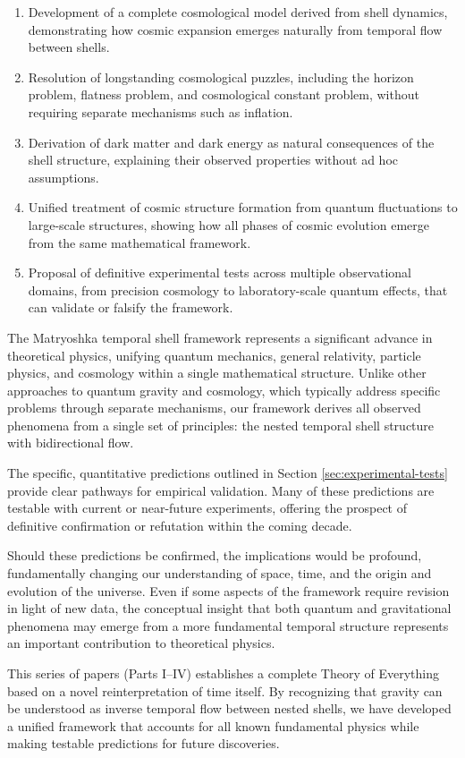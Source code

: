 \documentclass[12pt,a4paper]{article}
\begin{document}
\begin{enumerate}
    \item Development of a complete cosmological model derived from shell dynamics, demonstrating how cosmic expansion emerges naturally from temporal flow between shells.
    
    \item Resolution of longstanding cosmological puzzles, including the horizon problem, flatness problem, and cosmological constant problem, without requiring separate mechanisms such as inflation.
    
    \item Derivation of dark matter and dark energy as natural consequences of the shell structure, explaining their observed properties without ad hoc assumptions.
    
    \item Unified treatment of cosmic structure formation from quantum fluctuations to large-scale structures, showing how all phases of cosmic evolution emerge from the same mathematical framework.
    
    \item Proposal of definitive experimental tests across multiple observational domains, from precision cosmology to laboratory-scale quantum effects, that can validate or falsify the framework.
\end{enumerate}

The Matryoshka temporal shell framework represents a significant advance in theoretical physics, unifying quantum mechanics, general relativity, particle physics, and cosmology within a single mathematical structure. Unlike other approaches to quantum gravity and cosmology, which typically address specific problems through separate mechanisms, our framework derives all observed phenomena from a single set of principles: the nested temporal shell structure with bidirectional flow.

The specific, quantitative predictions outlined in Section \ref{sec:experimental-tests} provide clear pathways for empirical validation. Many of these predictions are testable with current or near-future experiments, offering the prospect of definitive confirmation or refutation within the coming decade.

Should these predictions be confirmed, the implications would be profound, fundamentally changing our understanding of space, time, and the origin and evolution of the universe. Even if some aspects of the framework require revision in light of new data, the conceptual insight that both quantum and gravitational phenomena may emerge from a more fundamental temporal structure represents an important contribution to theoretical physics.

This series of papers (Parts I--IV) establishes a complete Theory of Everything based on a novel reinterpretation of time itself. By recognizing that gravity can be understood as inverse temporal flow between nested shells, we have developed a unified framework that accounts for all known fundamental physics while making testable predictions for future discoveries.



\end{document}
